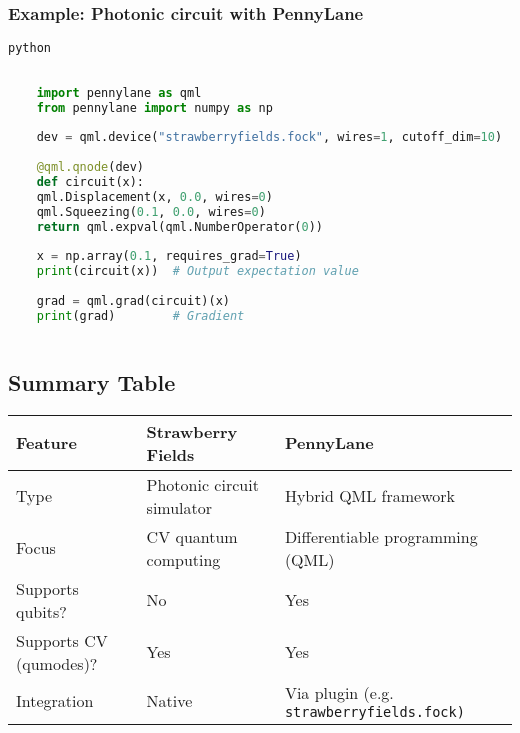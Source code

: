 \documentclass[12]{article}
\begin{document}
\subsubsection*{Example: Photonic circuit with PennyLane}	
\begin{lstlisting}[language=python]
	python
	
	
	import pennylane as qml
	from pennylane import numpy as np
	
	dev = qml.device("strawberryfields.fock", wires=1, cutoff_dim=10)
	
	@qml.qnode(dev)
	def circuit(x):
	qml.Displacement(x, 0.0, wires=0)
	qml.Squeezing(0.1, 0.0, wires=0)
	return qml.expval(qml.NumberOperator(0))
	
	x = np.array(0.1, requires_grad=True)
	print(circuit(x))  # Output expectation value
	
	grad = qml.grad(circuit)(x)
	print(grad)        # Gradient
	
\end{lstlisting}

\subsection*{ Summary Table}
	\begin{table}[h!]
	\centering
	\begin{tabular} {l|l|l}
		\hline
		\textbf{Feature} & \textbf{Strawberry Fields} & \textbf{PennyLane} \\
		\hline
		
		Type & Photonic circuit simulator &	Hybrid QML framework \\
		\hline
		Focus	& CV quantum computing &	Differentiable programming (QML) \\
		\hline
		Supports qubits? &	No &	Yes\\
		\hline
		Supports CV (qumodes)? &	Yes &	Yes\\
		\hline
		Integration & 	Native &	Via plugin (e.g. \colorbox{gray!30}{\texttt{strawberryfields.fock)}}\\
		\hline
	\end{tabular}	
	\end{table}
\end{document}
